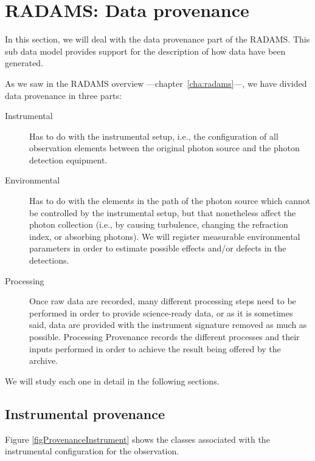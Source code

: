 \chapter{RADAMS: Data provenance} %
\label{cha:radams_data_provenance}
	
	In this section, we will deal with the data provenance part of
	the RADAMS. This sub data model provides support for the
	description of how data have been generated.
	
	 As we saw in the RADAMS overview
	---chapter~\ref{cha:radams}---, we have divided data provenance
	in three parts:
	
	\begin{description}
		\item[Instrumental] Has to do with the instrumental setup,
		i.e., the configuration of all observation elements between
		the original photon source and the photon detection
		equipment.
		
		 \item[Environmental] Has to do with the elements in the
		path of the photon source which cannot be controlled by the
		instrumental setup, but that nonetheless affect the photon
		collection (i.e., by causing turbulence, changing the
		refraction index, or absorbing photons). We will register
		measurable environmental parameters in order to estimate
		possible effects and/or defects in the detections.
		
		 \item[Processing] Once raw data are recorded, many
		different processing steps need to be performed in order to
		provide science-ready data, or as it is sometimes said,
		data are provided with the instrument signature removed as
		much as possible. Processing Provenance records the
		different processes and their inputs performed in order to
		achieve the result being offered by the archive.
	\end{description}
	
	We will study each one in detail in the following sections.
	
	\section{Instrumental provenance} %
	\label{sec:instrumental_provenance}
		
		Figure \ref{figProvenanceInstrument} shows the classes
		associated with the instrumental configuration for the
		observation.

